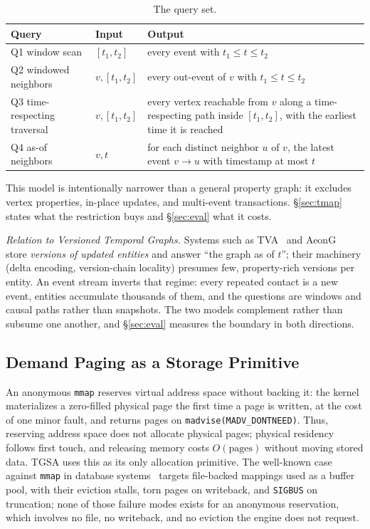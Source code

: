 \documentclass[sigconf,nonacm]{acmart}
\newcommand{\sys}{TGSA\xspace}
\begin{document}
\begin{table}[t]
\centering\footnotesize
\setlength{\tabcolsep}{4pt}
\caption{\small The query set.}
\label{tab:queries}
\begin{tabular}{@{}llp{40mm}@{}}
\toprule
Query & Input & Output \\
\midrule
Q1 window scan & $[t_1,t_2]$ & every event with $t_1 \le t \le t_2$ \\
Q2 windowed neighbors & $v, [t_1,t_2]$ & every out-event of $v$ with $t_1 \le t \le t_2$ \\
Q3 time-respecting traversal & $v, [t_1,t_2]$ & every vertex reachable from $v$ along a time-respecting path inside $[t_1,t_2]$, with the earliest time it is reached \\
Q4 as-of neighbors & $v, t$ & for each distinct neighbor $u$ of $v$, the latest event $v \to u$ with timestamp at most $t$ \\
\bottomrule
\end{tabular}
\end{table}

This model is intentionally narrower than a general property graph: it
excludes vertex properties, in-place updates, and multi-event
transactions. \S\ref{sec:tmap} states what the restriction buys and
\S\ref{sec:eval} what it costs.

\emph{Relation to Versioned Temporal Graphs.} Systems such as
TVA~\cite{li2026tva} and AeonG~\cite{hou2024aeong} store \emph{versions
of updated entities} and answer ``the graph as of $t$''; their
machinery (delta encoding, version-chain locality) presumes few,
property-rich versions per entity. An event stream inverts that regime:
every repeated contact is a new event, entities accumulate thousands of
them, and the questions are windows and causal paths rather than
snapshots. The two models complement rather than subsume one another,
and \S\ref{sec:eval} measures the boundary in both directions.

\subsection{Demand Paging as a Storage Primitive}
An anonymous \texttt{mmap} reserves virtual address space without
backing it: the kernel materializes a zero-filled physical page the
first time a page is written, at the cost of one minor fault, and
returns pages on \texttt{madvise(MADV\_DONTNEED)}. Thus, reserving address space does not allocate physical pages;
physical residency follows first touch, and releasing memory costs
$O(\text{pages})$ without moving stored data. \sys uses this as its only
allocation primitive. The well-known case against \texttt{mmap} in
database systems~\cite{crotty2022mmap, leis2023vmcache} targets file-backed mappings
used as a buffer pool, with their eviction stalls, torn pages on
writeback, and \texttt{SIGBUS} on truncation; none of those failure
modes exists for an anonymous reservation, which involves no file, no
writeback, and no eviction the engine does not request.
\end{document}
